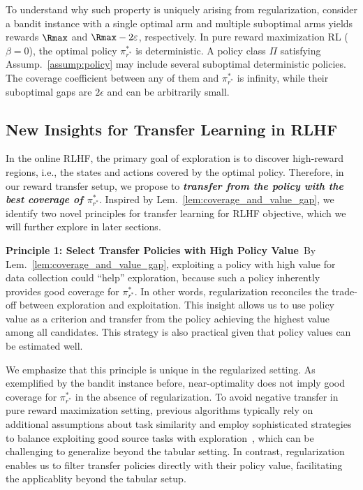 %
%
%

To understand why such property is uniquely arising from regularization, consider a bandit instance with a single optimal arm and multiple suboptimal arms yields rewards $\Rmax$ and $\Rmax - 2\epsilon$, respectively.
In pure reward maximization RL ($\beta = 0$), the optimal policy $\pi^*_{r^*}$ is deterministic.
A policy class $\Pi$ satisfying Assump.~\ref{assump:policy} may include several suboptimal deterministic policies.
The coverage coefficient between any of them and $\pi^*_{r^*}$ is infinity, while their suboptimal gaps are $2\epsilon$ and can be arbitrarily small.

%
%
%
%
%


\subsection{New Insights for Transfer Learning in RLHF}\label{sec:new_insights}
In the online RLHF, the primary goal of exploration is to discover high-reward regions, i.e., the states and actions covered by the optimal policy.
Therefore, in our reward transfer setup, we propose to \textbf{\emph{transfer from the policy with the best coverage of $\pi^*_{r^*}$}}.
Inspired by Lem.~\ref{lem:coverage_and_value_gap}, we identify two novel principles for transfer learning for RLHF objective, which we will further explore in later sections.

\textbf{Principle 1: Select Transfer Policies with High Policy Value}~By Lem.~\ref{lem:coverage_and_value_gap}, exploiting a policy with high value for data collection could ``help'' exploration, because such a policy inherently provides good coverage for $\pi^*_{r^*}$.
In other words, regularization reconciles the trade-off between exploration and exploitation.
This insight allows us to use policy value as a criterion and transfer from the policy achieving the highest value among all candidates.
This strategy is also practical given that policy values can be estimated well.

We emphasize that this principle is unique in the regularized setting.
As exemplified by the bandit instance before, near-optimality does not imply good coverage for $\pi^*_{r^*}$ in the absence of regularization.
To avoid negative transfer in pure reward maximization setting, previous algorithms typically rely on additional assumptions about task similarity and employ sophisticated strategies to balance exploiting good source tasks with exploration~\citep{golowich2022can,huang2023robust}, which can be challenging to generalize beyond the tabular setting.
In contrast, regularization enables us to filter transfer policies directly with their policy value, facilitating the applicablity beyond the tabular setup.


